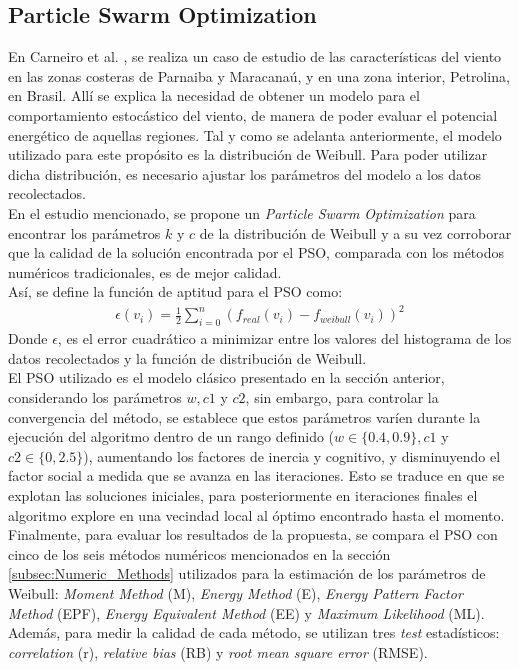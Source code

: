  \subsection{Particle Swarm Optimization}
 En Carneiro et al. \cite{Carneiro15}, se realiza un caso de estudio de las características del viento en las zonas costeras de Parnaiba y Maracanaú, y en una zona interior, Petrolina, en Brasil. Allí se explica la necesidad de obtener un modelo para el comportamiento estocástico del viento, de manera de poder evaluar el potencial energético de aquellas regiones. Tal y como se adelanta anteriormente, el modelo utilizado para este propósito es la distribución de Weibull. Para poder utilizar dicha distribución, es necesario ajustar los parámetros del modelo a los datos recolectados.\\
 En el estudio mencionado, se propone un \emph{Particle Swarm Optimization} para encontrar los parámetros $k$ y $c$ de la distribución de Weibull y a su vez corroborar que la calidad de la solución encontrada por el PSO, comparada con los métodos numéricos tradicionales, es de mejor calidad.\\
 Así, se define la función de aptitud para el PSO como:
\begin{align}\label{eq:PSO_FO}
    \epsilon(v_i) = \frac{1}{2}\sum_{i=0}^{n}(f_{real}(v_i) - f_{weibull}(v_i))^2
\end{align}
Donde $\epsilon$, es el error cuadrático a minimizar entre los valores del histograma de los datos recolectados y la función de distribución de Weibull.\\
El PSO utilizado es el modelo clásico presentado en la sección anterior, considerando los parámetros $w, c1$ y $c2$, sin embargo, para controlar la convergencia del método, se establece que estos parámetros varíen durante la ejecución del algoritmo dentro de un rango definido ($w \in \{0.4, 0.9\}, c1$ y $c2 \in \{0, 2.5\}$), aumentando los factores de inercia y cognitivo, y disminuyendo el factor social a medida que se avanza en las iteraciones. Esto se traduce en que se explotan las soluciones iniciales, para posteriormente en iteraciones finales el algoritmo explore en una vecindad local al óptimo encontrado hasta el momento.\\
Finalmente, para evaluar los resultados de la propuesta, se compara el PSO con cinco de los seis métodos numéricos mencionados en la sección \ref{subsec:Numeric_Methods} utilizados para la estimación de los parámetros de Weibull: \emph{Moment Method} (M), \emph{Energy Method} (E), \emph{Energy Pattern Factor Method} (EPF), \emph{Energy Equivalent Method} (EE) y \emph{Maximum Likelihood} (ML). Además, para medir la calidad de cada método, se utilizan tres \emph{test} estadísticos: \emph{correlation} (r), \emph{relative bias} (RB) y \emph{root mean square error} (RMSE).\\
